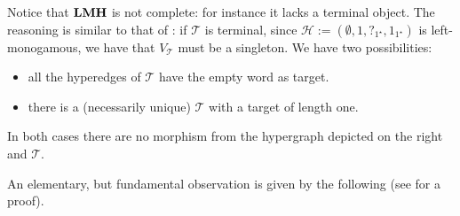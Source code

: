 \documentclass[3p]{elsarticle}
\newcommand{\catname}[1]{\textbf{\textup{#1}}}
\newcommand{\lmo}{\catname{LMH}}
\theoremstyle{remark}
\theoremstyle{definition}
\begin{document}
\begin{rem}Notice that  $\lmo$ is not complete: for instance it lacks a terminal object. The reasoning is similar to that of : if $\mathcal{T}$ is terminal, since  $\mathcal{H}:=(\emptyset, 1, ?_{1^\star}, 1_{1^\star} )$ is left-monogamous, we have that $V_{\mathcal{T}}$ must be a singleton. We have two possibilities:
	
\medskip 
\begin{minipage}[l]{.65\linewidth}
	\begin{itemize}
		\item  all the hyperedges of $\mathcal{T}$ have the empty word as target.
		\item there is a (necessarily unique) $\mathcal{T}$ with a target of length one.
	\end{itemize}
\end{minipage}
\begin{minipage}[r]{.15\linewidth}
\end{minipage}

\medskip
In both cases there are no morphism from the hypergraph depicted on the right and $\mathcal{T}$. 
\end{rem}

An elementary, but fundamental observation is given by the following (see  for a proof).
\end{document}
